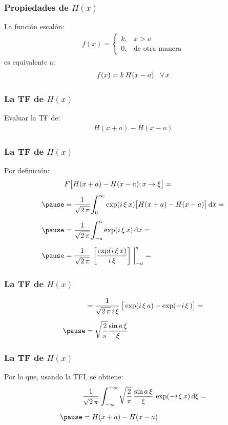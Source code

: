 \begin{frame}
\frametitle{Propiedades de $H (x)$}
La función escalón:
\pause
\begin{align*}
f (x) = \begin{cases}
k, & x > a \\[0.5em]
0, & \mbox{de otra manera}
\end{cases}
\end{align*}
es equivalente a:
\pause
\begin{align*}
f (x) = k \, H (x - a) \hspace{0.3cm} \forall \, x
\end{align*}
\end{frame}
\begin{frame}
\frametitle{La TF de $H (x)$}
Evaluar la TF de:
\pause
\begin{align*}
H (x + a) - H (x - a)
\end{align*}
\end{frame}
\begin{frame}
\frametitle{La TF de $H (x)$}
Por definición:
\pause
\begin{eqnarray*}
\begin{aligned}
&F \big[ H(x + a) - H(x - a); x \to \xi \big] = \\[0.5em] \pause
&= \dfrac{1}{\sqrt{2\, \pi}} \scaleint{6ex}_{\bs 0}^{\infty} \exp(i \, \xi \, x) \big[ H (x + a) - H (x - a) \big] \dd{x} = \\[0.5em] \pause
&= \dfrac{1}{\sqrt{2\, \pi}} \scaleint{6ex}_{\bs -a}^{a} \exp(i \, \xi \, x) \dd{x} = \\[0.5em] \pause
&= \dfrac{1}{\sqrt{2\, \pi}} \, \left[ \dfrac{\exp(i \, \xi \, x)}{i \, \xi} \right] \eval_{-a}^{a} =
\end{aligned}
\end{eqnarray*}
\end{frame}
\begin{frame}
\frametitle{La TF de $H (x)$}
\begin{eqnarray*}
\begin{aligned}
&= \dfrac{1}{\sqrt{2\, \pi} \, i \, \xi} \, \big[ \exp(i \, \xi \, a) - \exp(-i \, \xi \, ) \big] = \\[0.5em] \pause
&= \sqrt{\dfrac{2}{\pi}} \dfrac{\sin a \, \xi}{\xi}
\end{aligned}
\end{eqnarray*}
\end{frame}
\begin{frame}
\frametitle{La TF de $H (x)$}
Por lo que, usando la TFI, se obtiene:
\pause
\begin{eqnarray*}
\begin{aligned}
&\dfrac{1}{\sqrt{2 \, \pi}} \, \scaleint{6ex}_{\bs -\infty}^{+\infty} \sqrt{\dfrac{2}{\pi}} \, \dfrac{\sin a \, \xi}{\xi} \, \exp(- i \, \xi \, x) \dd{\xi} = \\[0.5em] \pause
&= H(x + a) - H (x- a)
\end{aligned}
\end{eqnarray*}
\end{frame}
